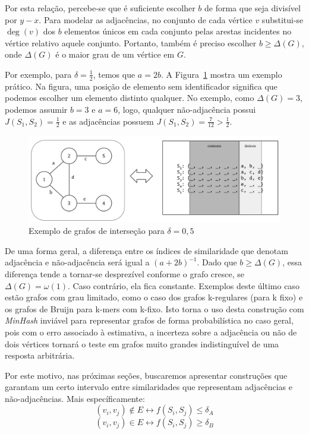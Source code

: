 Por esta relação, percebe-se que é suficiente escolher $b$ de forma que seja divisível por $y-x$. Para modelar as adjacências, no conjunto de cada vértice $v$ substitui-se $\deg(v)$ dos $b$ elementos únicos em cada conjunto pelas arestas incidentes no vértice relativo aquele conjunto. Portanto, também é preciso escolher $b \geq \Delta(G)$, onde $\Delta(G)$ é o maior grau de um vértice em $G$.

Por exemplo, para $\delta = \frac{1}{2}$, temos que $a = 2b$. A Figura~\ref{fig:graph_intersection2} mostra um exemplo prático. Na figura, uma posição de elemento sem identificador significa que podemos escolher um elemento distinto qualquer. No exemplo, como $\Delta(G) = 3$, podemos assumir $b = 3$ e $a = 6$, logo, qualquer não-adjacência possui $J(S_1, S_2) = \frac{1}{2}$ e as adjacências possuem $J(S_1, S_2) = \frac{7}{12} > \frac{1}{2}$.

\begin{figure}[!htbp]
  \centering
  \includegraphics[scale=0.6]{figures/graphs_intersection2.pdf}
  \caption{Exemplo de grafos de interseção para $\delta = 0,5$}
  \label{fig:graph_intersection2}
\end{figure}

De uma forma geral, a diferença entre os índices de similaridade que denotam adjacência e não-adjacência será igual a $(a + 2b)^{-1}$. Dado que $b \geq \Delta(G) $, essa diferença tende a tornar-se desprezível conforme o grafo cresce, se $\Delta(G) = \omega(1)$. Caso contrário, ela fica constante. Exemplos deste último caso estão grafos com grau limitado, como o caso dos grafos k-regulares (para k fixo) e os grafos de Bruijn para k-mers com k-fixo. Isto torna o uso desta construção com \emph{MinHash} inviável para representar grafos de forma probabilística no caso geral, pois com o erro associado à estimativa, a incerteza sobre a adjacência ou não de dois vértices tornará o teste em grafos muito grandes indistinguível de uma resposta arbitrária.

Por este motivo, nas próximas seções, buscaremos apresentar construções que garantam um certo intervalo entre similaridades que representam adjacências e não-adjacências. Mais específicamente:
\[
    (v_i, v_j) \notin E \leftrightarrow f(S_i, S_j) \leq \delta_A
\]\[
    (v_i, v_j) \in E \leftrightarrow f(S_i, S_j) \geq \delta_B
\]

